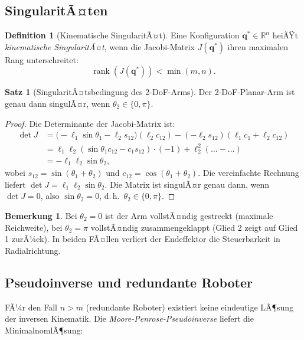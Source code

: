 ﻿\documentclass[a4paper,12pt]{article}
\theoremstyle{definition}
\newtheorem{definition}{Definition}
\newtheorem{satz}{Satz}
\newtheorem{bemerkung}{Bemerkung}
\begin{document}
\subsection{SingularitÃ¤ten}

\begin{definition}[Kinematische SingularitÃ¤t]
	Eine Konfiguration $\mathbf{q}^* \in \mathbb{R}^n$ heiÃŸt \emph{kinematische SingularitÃ¤t}, wenn die Jacobi-Matrix $J(\mathbf{q}^*)$ ihren maximalen Rang unterschreitet:
	\[
		\operatorname{rank}(J(\mathbf{q}^*)) < \min(m, n).
	\]
\end{definition}

\begin{satz}[SingularitÃ¤tsbedingung des 2-DoF-Arms]
\label{satz:singular}
	Der 2-DoF-Planar-Arm ist genau dann singulÃ¤r, wenn $\theta_2 \in \{0, \pi\}$.
\end{satz}

\begin{proof}
	Die Determinante der Jacobi-Matrix ist:
	\begin{align*}
		\det J &= \bigl(-\ell_1 \sin\theta_1 - \ell_2 s_{12}\bigr)(\ell_2 c_{12}) - (-\ell_2 s_{12})(\ell_1 c_1 + \ell_2 c_{12}) \\
		       &= \ell_1 \ell_2 (\sin\theta_1 c_{12} - c_1 s_{12}) \cdot (-1) + \ell_2^2(\ldots - \ldots) \\
		       &= -\ell_1\ell_2 \sin\theta_2,
	\end{align*}
	wobei $s_{12} = \sin(\theta_1+\theta_2)$ und $c_{12} = \cos(\theta_1+\theta_2)$. Die vereinfachte Rechnung liefert $\det J = \ell_1 \ell_2 \sin\theta_2$. Die Matrix ist singulÃ¤r genau dann, wenn $\det J = 0$, also $\sin\theta_2 = 0$, d.\,h.\ $\theta_2 \in \{0, \pi\}$. \qedhere
\end{proof}

\begin{bemerkung}
	Bei $\theta_2 = 0$ ist der Arm vollstÃ¤ndig gestreckt (maximale Reichweite), bei $\theta_2 = \pi$ vollstÃ¤ndig zusammengeklappt (Glied 2 zeigt auf Glied 1 zurÃ¼ck). In beiden FÃ¤llen verliert der Endeffektor die Steuerbarkeit in Radialrichtung.
\end{bemerkung}

\subsection{Pseudoinverse und redundante Roboter}

FÃ¼r den Fall $n > m$ (redundante Roboter) existiert keine eindeutige LÃ¶sung der inversen Kinematik. Die \emph{Moore-Penrose-Pseudoinverse} liefert die MinimalnomlÃ¶sung:
\end{document}

